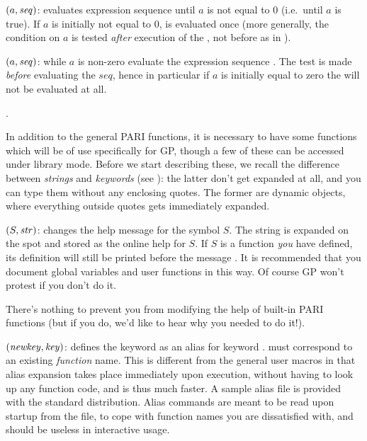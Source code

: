 $(a,\hbox{\it seq\/})$: evaluates expression sequence 
until $a$ is not equal to 0 (i.e.~until $a$ is true). If $a$ is initially
not equal to 0,  is evaluated once (more generally, the condition
on $a$ is tested \emph{after} execution of the , not before as in
).

$(a,\hbox{\it seq\/})$: while $a$ is non-zero evaluate the
expression sequence . The test is made \emph{before} evaluating
the $seq$, hence in particular if $a$ is initially equal to zero the
 will not be evaluated at all.\smallskip

.
\label{se:gp_program}

  In addition to the general PARI functions, it is necessary to have some
functions which will be of use specifically for GP, though a few of these can
be accessed under library mode. Before we start describing these, we recall
the difference between \emph{strings} and \emph{keywords} (see
): the latter don't get expanded at all, and you can type
them without any enclosing quotes. The former are dynamic objects, where
everything outside quotes gets immediately expanded.

$(S,\hbox{\it str\/})$:\label{se:addhelp} changes the help
message for the symbol $S$. The string  is expanded on the spot
and stored as the online help for $S$. If $S$ is a function \emph{you} have
defined, its definition will still be printed before the message .
It is recommended that you document global variables and user functions in
this way. Of course GP won't protest if you don't do it.

There's nothing to prevent you from modifying the help of built-in PARI
functions (but if you do, we'd like to hear why you needed to do it!).

$(\hbox{\it newkey\/},\hbox{\it key\/})$: defines the keyword
 as an alias for keyword .  must correspond
to an existing \emph{function} name. This is different from the general user
macros in that alias expansion takes place immediately upon execution,
without having to look up any function code, and is thus much faster. A
sample alias file  is provided with the standard
distribution. Alias commands are meant to be read upon startup from the
 file, to cope with function names you are dissatisfied with, and
should be useless in interactive usage.

